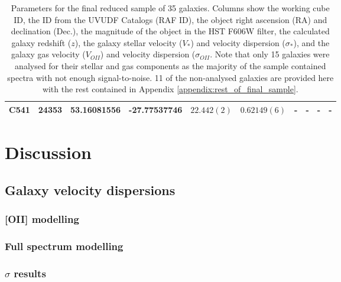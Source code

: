 \documentclass[12pt, twocolumn]{revtex4-1}    %
\begin{document}
\begin{table}
\begin{tabular}{c@{\hskip 10pt}c@{\hskip 10pt}c@{\hskip 10pt}c@{\hskip 10pt}c@{\hskip 10pt}c@{\hskip 10pt}c@{\hskip 10pt}c@{\hskip 10pt}c@{\hskip 10pt}c}
C541 & 24353 & 53.16081556 & -27.77537746 & $22.442(2)$ & $0.62149(6)$ & - & - & - & - \\ 
 \hline
\end{tabular}
\caption{Parameters for the final reduced sample of 35 galaxies. Columns show the working cube ID, the ID from the UVUDF Catalogs \citep{2015AJ....150...31R} (RAF ID), the object right ascension (RA) and declination (Dec.), the magnitude of the object in the HST F606W filter, the calculated galaxy redshift ($z$), the galaxy stellar velocity ($V_*$) and velocity dispersion ($\sigma_*$), and the galaxy gas velocity ($V_{OII}$) and velocity dispersion ($\sigma_{OII}$. Note that only 15 galaxies were analysed for their stellar and gas components as the majority of the sample contained spectra with not enough signal-to-noise. 11 of the non-analysed galaxies are provided here with the rest contained in Appendix \ref{appendix:rest_of_final_sample}.}
\label{table:final_sample}
\end{table}

\twocolumngrid

\section{Discussion}

\subsection{Galaxy velocity dispersions}

\subsubsection{[OII] modelling}

\subsubsection{Full spectrum modelling}

\subsubsection{$\sigma$ results}
\end{document}
